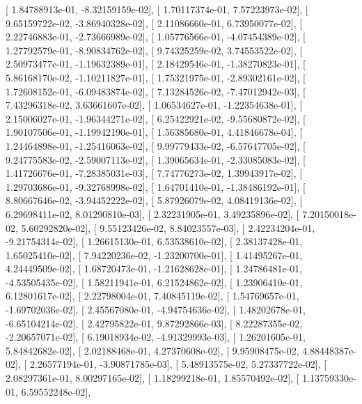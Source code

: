 \documentclass{article}
\begin{document}
       [  1.84788913e-01,  -8.32159159e-02],
       [  1.70117374e-01,   7.57223973e-02],
       [  9.65159722e-02,  -3.86940328e-02],
       [  2.11086660e-01,   6.73950077e-02],
       [  2.22746883e-01,  -2.73666989e-02],
       [  1.05776566e-01,  -4.07454389e-02],
       [  1.27792579e-01,  -8.90834762e-02],
       [  9.74325259e-02,   3.74553522e-02],
       [  2.50973477e-01,  -1.19632389e-01],
       [  2.18429546e-01,  -1.38270823e-01],
       [  5.86168170e-02,  -1.10211827e-01],
       [  1.75321975e-01,  -2.89302161e-02],
       [  1.72608152e-01,  -6.09483874e-02],
       [  7.13284526e-02,  -7.47012942e-03],
       [  7.43296318e-02,   3.63661607e-02],
       [  1.06534627e-01,  -1.22354638e-01],
       [  2.15006027e-01,  -1.96344271e-02],
       [  6.25422921e-02,  -9.55680872e-02],
       [  1.90107506e-01,  -1.19942190e-01],
       [  1.56385680e-01,   4.41846678e-04],
       [  1.24464898e-01,  -1.25416063e-02],
       [  9.99779433e-02,  -6.57647705e-02],
       [  9.24775583e-02,  -2.59007113e-02],
       [  1.39065634e-01,  -2.33085083e-02],
       [  1.41726676e-01,  -7.28385031e-03],
       [  7.74776273e-02,   1.39943917e-02],
       [  1.29703686e-01,  -9.32768998e-02],
       [  1.64701410e-01,  -1.38486192e-01],
       [  8.80667646e-02,  -3.94452222e-02],
       [  5.87926079e-02,   4.08419136e-02],
       [  6.29698411e-02,   8.01290810e-03],
       [  2.32231905e-01,   3.49235896e-02],
       [  7.20150018e-02,   5.60292820e-02],
       [  9.55123426e-02,   8.84023557e-03],
       [  2.42234204e-01,  -9.21754314e-02],
       [  1.26615130e-01,   6.53538610e-02],
       [  2.38137428e-01,   1.65025410e-02],
       [  7.94220236e-02,  -1.23200700e-01],
       [  1.41495267e-01,   4.24449509e-02],
       [  1.68720473e-01,  -1.21628628e-01],
       [  1.24786481e-01,  -4.53505435e-02],
       [  1.58211941e-01,   6.21524862e-02],
       [  1.23906410e-01,   6.12801617e-02],
       [  2.22798004e-01,   7.40845119e-02],
       [  1.54769657e-01,  -1.69702036e-02],
       [  2.45567080e-01,  -4.94754636e-02],
       [  1.48202678e-01,  -6.65104214e-02],
       [  2.42795822e-01,   9.87292866e-03],
       [  8.22287355e-02,  -2.20657071e-02],
       [  6.19018934e-02,  -4.91329993e-03],
       [  1.26201605e-01,   5.84842682e-02],
       [  2.02188468e-01,   4.27370608e-02],
       [  9.95908475e-02,   4.88448387e-02],
       [  2.26577194e-01,  -3.90871785e-03],
       [  5.48913575e-02,   5.27337722e-02],
       [  2.08297361e-01,   8.00297165e-02],
       [  1.18299218e-01,   1.85570492e-02],
       [  1.13759330e-01,   6.59552248e-02],
\end{document}
